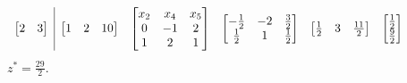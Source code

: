 \begin{equation*}
{\begin{array}{ c|c c c c c c c c c c c c c }
\begin{bmatrix}
2 & 3
\end{bmatrix} & \begin{bmatrix}
1 & 2 & 10
\end{bmatrix} & \begin{bmatrix}
x_{2} & x_{4} & x_{5}\\
0 & -1 & 2\\
1 & 2 & 1
\end{bmatrix} & \begin{bmatrix}
-\frac{1}{2} & -2 & \frac{3}{2}\\
\frac{1}{2} & 1 & \frac{1}{2}
\end{bmatrix} & \begin{bmatrix}
\frac{1}{2} & 3 & \frac{11}{2}
\end{bmatrix} & \begin{bmatrix}
\frac{1}{2}\\
\frac{9}{2}
\end{bmatrix} &  &  &  & 
\end{array}
}
\end{equation*}
$z^{*} =\frac{29}{2}$.

